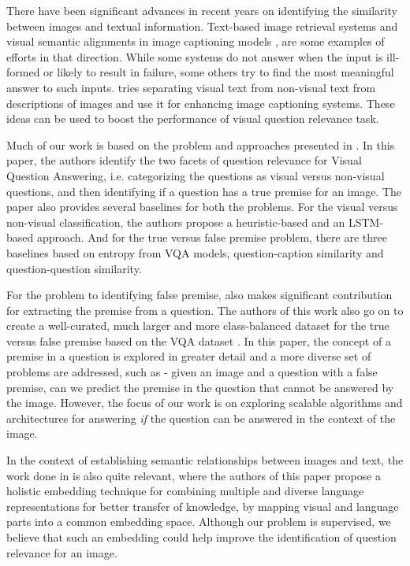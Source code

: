 There have been significant advances in recent years on identifying the similarity between images and textual information. Text-based image retrieval \cite{liu2009boost} systems and visual semantic alignments in image captioning models \cite{karpathy2015deep}, \cite{fang2015captions} are some examples of efforts in that direction. While some systems do not answer when the input is ill-formed or likely to result in failure, some others try to find the most meaningful answer to such inputs. \cite{dodge2012detecting} tries separating visual text from non-visual text from descriptions of images and use it for enhancing image captioning systems. These ideas can be used to boost the performance of visual question relevance task. 

Much of our work is based on the problem and approaches presented in \cite{ray2016question}. In this paper, the authors identify the two facets of question relevance for Visual Question Answering, i.e. categorizing the questions as visual versus non-visual questions, and then identifying if a question has a true premise for an image. The paper also provides several baselines for both the problems. For the visual versus non-visual classification, the authors propose a heuristic-based and an LSTM-based approach. And for the true versus false premise problem, there are three baselines based on entropy from VQA models, question-caption similarity and question-question similarity. 

For the problem to identifying false premise, \cite{mahendru2017promise} also makes significant contribution for extracting the premise from a question. The authors of this work also go on to create a well-curated, much larger and more class-balanced dataset for the true versus false premise based on the VQA dataset \cite{AntolALMBZP15}. In this paper, the concept of a premise in a question is explored in greater detail and a more diverse set of problems are addressed, such as - given an image and a question with a false premise, can we predict the premise in the question that cannot be answered by the image. However, the focus of our work is on exploring scalable algorithms and architectures for answering \textit{if} the question can be answered in the context of the image.

In the context of establishing semantic relationships between images and text, the work done in \cite{AkataMFS16} is also quite relevant, where the authors of this paper propose a holistic embedding technique for combining multiple and diverse language representations for better transfer of knowledge, by mapping visual and language parts into a common embedding space. Although our problem is supervised, we believe that such an embedding could help improve the identification of question relevance for an image. 

